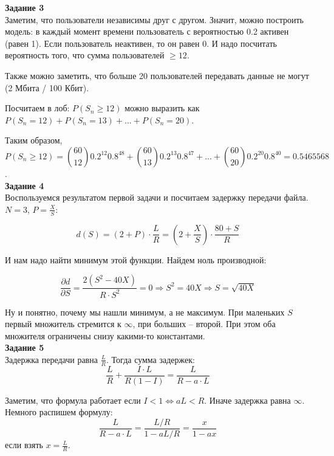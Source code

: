 \documentclass[11pt]{article}
\begin{document}
{\bf Задание 3}\\

Заметим, что пользователи независимы друг с другом.
Значит, можно построить модель: в каждый момент времени пользователь с вероятностью 0.2 активен (равен 1).
Если пользователь неактивен, то он равен 0.
И надо посчитать вероятность того, что сумма пользователей $\geq 12$.

Также можно заметить, что больше 20 пользователей передавать данные не могут (2 Мбита / 100 Кбит).

Посчитаем в лоб: $P(S_n \geq 12)$ можно выразить как $P(S_n = 12) + P(S_n = 13) + ... + P(S_n = 20)$.

Таким образом, \[P(S_n \geq 12) = \binom{60}{12} 0.2^{12} 0.8^{48} + \binom{60}{13} 0.2^{13} 0.8^{47} + ... + \binom{60}{20} 0.2^{20} 0.8^{40} = 0.5465568\].\\

{\bf Задание 4}\\

Воспользуемся результатом первой задачи и посчитаем задержку передачи файла.
$N = 3$, $P = \frac{X}{S}$:

\[d(S) = \left(2 + P \right) \cdot \frac{L}{R} = \left(2 + \frac{X}{S} \right) \cdot \frac{80 + S}{R} \]

И нам надо найти минимум этой функции.
Найдем ноль производной:

\[ \frac{\partial d}{\partial S} = \frac{2 \left( S^2 - 40 X \right)}{R \cdot S^2} = 0 \Longrightarrow S^2 = 40X \Longrightarrow S = \sqrt {40X} \]

Ну и понятно, почему мы нашли минимум, а не максимум.
При маленьких $S$ первый множитель стремится к $\infty$, при больших -- второй.
При этом оба множителя ограничены снизу какими-то константами.\\

{\bf Задание 5}\\

    Задержка передачи равна $\frac{L}{R}$.
    Тогда сумма задержек:
    \[ \frac{L}{R} + \frac{I \cdot L}{R(1 - I)} = \frac{L}{R - a \cdot L} \]

    Заметим, что формула работает если $I < 1 \Longleftrightarrow aL < R $.
    Иначе задержка равна $\infty$.\\

    Немного распишем формулу:
    \[\frac{L}{R - a \cdot L} = \frac{L / R}{1 - a L / R} = \frac{x}{1 - ax} \]
    если взять $x = \frac{L}{R}$.
\end{document}
